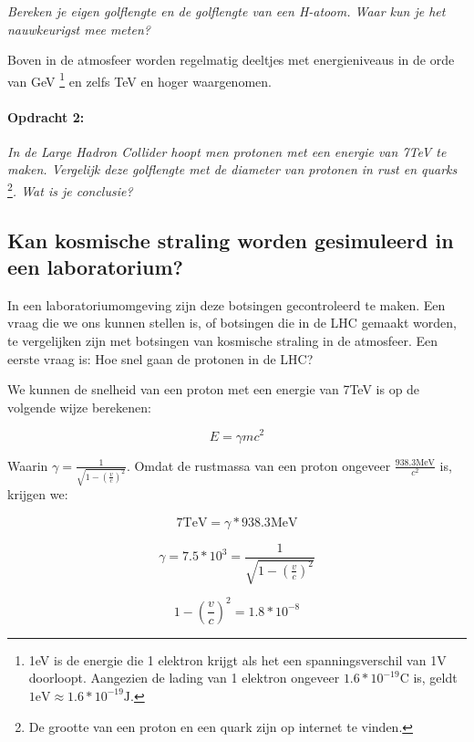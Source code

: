 \emph{Bereken je eigen golflengte en de golflengte van een H-atoom.
Waar kun je het nauwkeurigst mee meten?}

Boven in de atmosfeer worden regelmatig deeltjes met energieniveaus in
de orde van GeV \footnote{1eV is de energie die 1 elektron krijgt als
het een spanningsverschil van 1V doorloopt. Aangezien de lading van 1
elektron ongeveer $1.6*10^{-19}\mathrm{C}$ is, geldt
$1\mathrm{eV}\approx1.6*10^{-19}\mathrm{J}$.} en zelfs TeV en hoger
waargenomen.


\paragraph*{Opdracht 2:}

\emph{In de Large Hadron Collider hoopt men protonen met een energie van
7TeV te maken. Vergelijk deze golflengte met de diameter van protonen in
rust en quarks} \footnote{De grootte van een proton en een quark zijn op
internet te vinden.}\emph{. Wat is je conclusie?}


\subsection{Kan kosmische straling worden gesimuleerd in een laboratorium?}

In een laboratoriumomgeving zijn deze botsingen gecontroleerd te maken.
Een vraag die we ons kunnen stellen is, of botsingen die in de LHC
gemaakt worden, te vergelijken zijn met botsingen van kosmische straling
in de atmosfeer. Een eerste vraag is: Hoe snel gaan de protonen in
de LHC?

We kunnen de snelheid van een proton met een energie van 7TeV is op
de volgende wijze berekenen:

\begin{equation}
E=\gamma mc^{2}
\end{equation}


Waarin $\gamma=\frac{1}{\sqrt{1-\left(\frac{v}{c}\right)^{2}}}$.
Omdat de rustmassa van een proton ongeveer $\frac{938.3\mathrm{MeV}}{c^{2}}$
is, krijgen we:

\begin{equation}
7\mathrm{TeV}=\gamma*938.3\mathrm{MeV}
\end{equation}


\begin{equation}
\gamma=7.5*10^{3}=\frac{1}{\sqrt{1-\left(\frac{v}{c}\right)^{2}}}
\end{equation}


\begin{equation}
1-\left(\frac{v}{c}\right)^{2}=1.8*10^{-8}
\end{equation}


